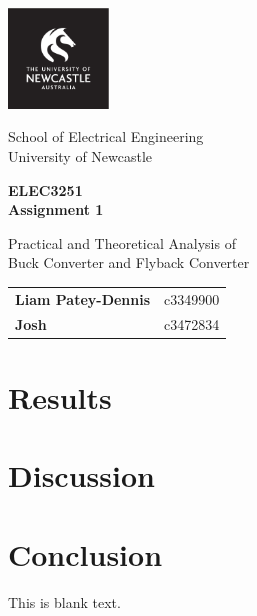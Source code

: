 \documentclass[12pt,twoside]{article}
\begin{document}
\setcounter{page}{1}
\begin{titlepage}
    \begin{center}

        \includegraphics[width=0.2\textwidth]{LOGO_Square.pdf}

        \vspace*{0.4cm}
        School of Electrical Engineering \\
        University of Newcastle
        
        \vspace{1cm}
        \huge
        \textbf{\textsf{ELEC3251 \\ Assignment 1}}

        \vspace{0.5cm}
        \Large
        Practical and Theoretical Analysis of \\ Buck Converter and Flyback Converter

        \vspace{1.5cm}
        \normalsize
        \begin{tabular}{l|r}
            \textbf{Liam Patey-Dennis} & c3349900 \\
            \textbf{Josh} & c3472834
        \end{tabular}
        \vfill    
    \end{center}
\end{titlepage}


\section{Results}
\newpage
\section{Discussion}
\citep{BS412-EN}
\citep{jay1995write}
\newpage
\section{Conclusion}
This is blank text.
\newpage


\end{document}
